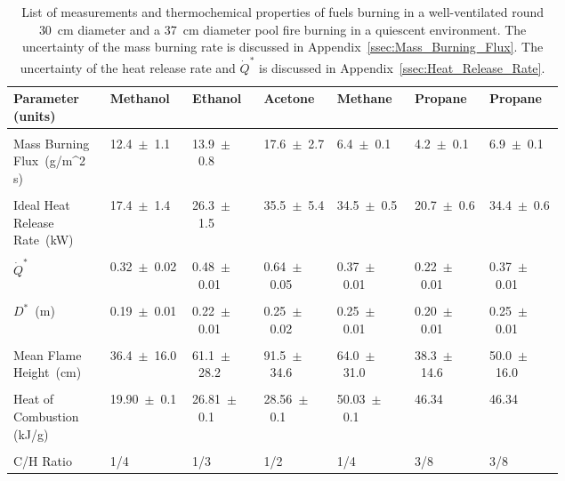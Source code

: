 \documentclass[12pt]{article}
\begin{document}
\begin{table}[!t]
\caption[List of measurements and thermochemical properties of fuels]{List of measurements and thermochemical properties of fuels burning in a well-ventilated round 30~cm diameter and a 37~cm diameter pool fire burning in a quiescent environment. The uncertainty of the mass burning rate is discussed in Appendix~\ref{ssec:Mass_Burning_Flux}. The uncertainty of the heat release rate and $\dot{Q}^*$ is discussed in Appendix~\ref{ssec:Heat_Release_Rate}.}
\label{tab:Pool_Fire_Parameters_Table}
\centering
	\footnotesize
	\begin{tabular}{p{0.125\linewidth}p{0.1\linewidth}p{0.1\linewidth}p{0.1\linewidth}p{0.1\linewidth}p{0.1\linewidth}p{0.1\linewidth}}
\hline
\textbf{Parameter (units)} &\textbf{Methanol}& \textbf{Ethanol}& \textbf{Acetone}&\textbf{Methane}&\textbf{Propane}&\textbf{Propane}\\
\hline
\\[0.01cm]
Mass Burning Flux~(\si{g/{m^2 s}})	&	12.4~$\pm$~1.1		&	13.9~$\pm$~0.8		&	17.6~$\pm$~2.7		&	6.4~$\pm$~0.1	&4.2~$\pm$~0.1		& 6.9~$\pm$~0.1\\
\\[0.01cm]
Ideal Heat Release Rate~(\si{kW})	&	17.4~$\pm$~1.4		&	26.3~$\pm$~1.5		&	35.5~$\pm$~5.4		&	34.5~$\pm$~0.5	&20.7~$\pm$~0.6  	& 34.4~$\pm$~0.6\\
\\[0.01cm]							
$\dot{Q}^* $				&	0.32~$\pm$~0.02		&	0.48~$\pm$~0.01		&	0.64~$\pm$~0.05		&	0.37~$\pm$~0.01	&0.22~$\pm$~0.01	& 0.37~$\pm$~0.01\\	
\\[0.01cm]
$D^*$~(\si{m})				&	0.19~$\pm$~0.01		&	0.22~$\pm$~0.01		&	0.25~$\pm$~0.02		& 	0.25~$\pm$~0.01	&0.20~$\pm$~0.01 	& 0.25~$\pm$~0.01\\
\\[0.01cm]
Mean Flame Height~(\si{cm})		&	36.4~$\pm$~16.0		&	61.1~$\pm$~28.2		&	91.5~$\pm$~34.6		&	64.0~$\pm$~31.0	&	38.3~$\pm$~14.6	& 50.0~$\pm$~16.0\\
\\[0.01cm]
Heat of Combustion (kJ/g)~\cite{Burgess_2022,SFPE}	&	19.90~$\pm$~0.1				&	26.81~$\pm$~0.1					&	28.56~$\pm$~0.1					&	50.03~$\pm$~0.1				&	46.34			& 46.34	\\	
\\[0.01cm]
C/H Ratio					&	1/4				&	1/3				&	1/2				&	1/4			&	3/8			& 3/8\\
\hline
\end{tabular}
\end{table}
\end{document}
